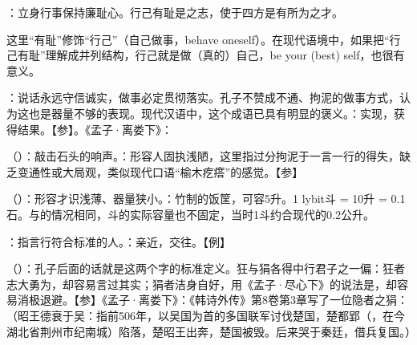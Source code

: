 {
\item {}：立身行事保持廉耻心。行己有耻是之志，使于四方是有所为之才。

这里“有耻”修饰“行己”（自己做事，behave oneself）。在现代语境中，如果把“行己有耻”理解成并列结构，行己就是做（真的）自己，be your (best) self，也很有意义。

\item {}：说话永远守信诚实，做事必定贯彻落实。孔子不赞成不通、拘泥的做事方式，认为这也是器量不够的表现。现代汉语中，这个成语已具有明显的褒义。：实现，获得结果。【参】。《孟子·离娄下》：
\item {}（）：敲击石头的响声。：形容人固执浅陋，这里指过分拘泥于一言一行的得失，缺乏变通性或大局观，类似现代口语“榆木疙瘩”的感觉。【参】 
\item {}（）：形容才识浅薄、器量狭小。：竹制的饭筐，可容5升。1 lybit{斗} = 10升 = 0.1石。与的情况相同，斗的实际容量也不固定，当时1斗约合现代的0.2公升。
}
{}


{
\item {}：指言行符合标准的人。：亲近，交往。【例】 
\item {}（）：孔子后面的话就是这两个字的标准定义。狂与狷各得中行君子之一偏：狂者志大勇为，却容易言过其实；狷者洁身自好，用《孟子·尽心下》的说法是，却容易消极退避。【参】《孟子·离娄下》：《韩诗外传》第8卷第3章写了一位隐者之狷：（昭王德衰于吴：指前506年，以吴国为首的多国联军讨伐楚国，楚都郢（，在今湖北省荆州市纪南城）陷落，楚昭王出奔，楚国被毁。后来哭于秦廷，借兵复国。）
}
{}


